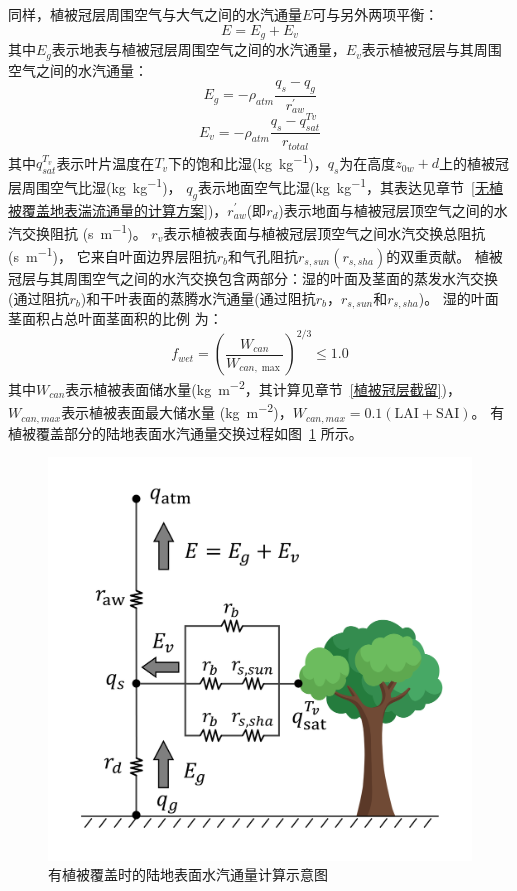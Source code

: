 同样，植被冠层周围空气与大气之间的水汽通量$E$可与另外两项平衡：
\begin{equation}\label{EV_balance}
E=E_{g}+E_{v}
\end{equation}
其中$E_{g}$表示地表与植被冠层周围空气之间的水汽通量，$E_{v}$表示植被冠层与其周围空气之间的水汽通量：
\begin{equation}\label{eq:Eg}
E_{g}=-\rho_{atm} \frac{q_{s}-q_{g}}{r_{a w}^{\prime}}
\end{equation}
\begin{equation}
E_{v}=-\rho_{atm} \frac{q_{s}-q_{s a t}^{T v}}{r_{t o t a l}}
\end{equation}
其中$q_{sat}^{T_v}$表示叶片温度在$T_v$下的饱和比湿(\unit{kg.kg^{-1}})，$q_s$为在高度$z_{0w}+d$上的植被冠层周围空气比湿(\unit{kg.kg^{-1}})，
$q_g$表示地面空气比湿(\unit{kg.kg^{-1}}，其表达见章节~\ref{无植被覆盖地表湍流通量的计算方案})，$r_{aw}^\prime$(即$r_d$)表示地面与植被冠层顶空气之间的水汽交换阻抗 (\unit{s.m^{-1}})。
$r_{v}$表示植被表面与植被冠层顶空气之间水汽交换总阻抗 (\unit{s.m^{-1}})，
它来自叶面边界层阻抗$r_b$和气孔阻抗$r_{s,sun}\left(r_{s,sha}\right)$的双重贡献。
植被冠层与其周围空气之间的水汽交换包含两部分：湿的叶面及茎面的蒸发水汽交换(通过阻抗$r_b$)和干叶表面的蒸腾水汽通量(通过阻抗$r_b$，$r_{s,sun}$和$r_{s,sha}$)。
湿的叶面茎面积占总叶面茎面积的比例 \citep{dickinson1993biosphere} 为：
\begin{equation}\label{eq:fwet}
f_{w e t}=\left(\frac{W_{c a n}}{W_{c a n, \max }}\right)^{2 / 3} \leqslant 1.0
\end{equation}
其中$W_{can}$表示植被表面储水量(\unit{kg.m^{-2}}，其计算见章节~\ref{植被冠层截留})，$W_{can,max}$表示植被表面最大储水量
(\unit{kg.m^{-2}})，$W_{can,max}=0.1\left(\text {LAI}+ \text {SAI}\right)$。
有植被覆盖部分的陆地表面水汽通量交换过程如图~\ref{fig:有植被覆盖部分的陆地表面水汽通量示意图} 所示。
{
\begin{figure}[htbp]
\centering
\includegraphics[width=0.6\linewidth]{Figures/地表湍流交换过程/有植被潜热交换阻抗示意图.png}
\caption{有植被覆盖时的陆地表面水汽通量计算示意图}
\label{fig:有植被覆盖部分的陆地表面水汽通量示意图}
\end{figure}
}

